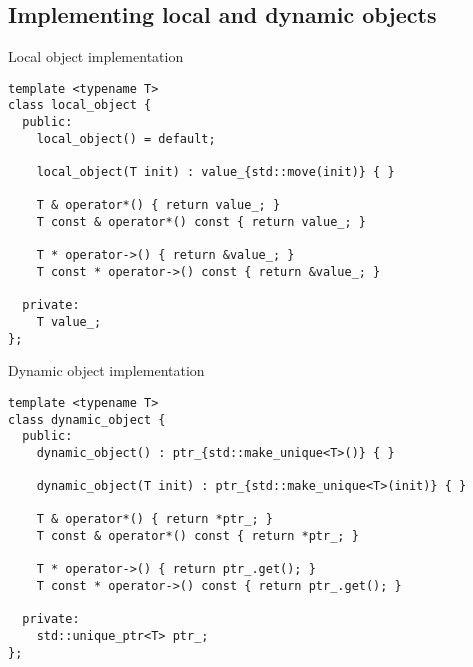 \subsection{Implementing local and dynamic objects}

\begin{frame}[t,fragile]
\begin{block}{Local object implementation}
\begin{lstlisting}
template <typename T>
class local_object {
  public:
    local_object() = default;

    local_object(T init) : value_{std::move(init)} { }

    T & operator*() { return value_; }
    T const & operator*() const { return value_; }

    T * operator->() { return &value_; }
    T const * operator->() const { return &value_; }

  private:
    T value_;
};
\end{lstlisting}
\end{block}
\end{frame}

\begin{frame}[t,fragile]
\begin{block}{Dynamic object implementation}
\begin{lstlisting}
template <typename T>
class dynamic_object {
  public:
    dynamic_object() : ptr_{std::make_unique<T>()} { }

    dynamic_object(T init) : ptr_{std::make_unique<T>(init)} { }

    T & operator*() { return *ptr_; }
    T const & operator*() const { return *ptr_; }

    T * operator->() { return ptr_.get(); }
    T const * operator->() const { return ptr_.get(); }

  private:
    std::unique_ptr<T> ptr_;
};
\end{lstlisting}
\end{block}
\end{frame}
